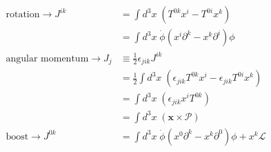 \documentclass[10pt,a4paper]{report}
\theoremstyle{definition}
\begin{document}
\begin{enumerate}[a)]
\begin{align}
\text{rotation}\rightarrow J^{ik}
&=\int d^3x\;(T^{0k}x^i-T^{0i}x^k)\\
&=\int d^3x\;\dot{\phi}(x^i\partial^k-x^k\partial^i)\phi\\
\text{angular momentum}\rightarrow J_j
&\equiv\frac{1}{2}\epsilon_{jik}J^{ik}\\
&=\frac{1}{2}\int d^3x\;(\epsilon_{jik}T^{0k}x^i-\epsilon_{jik}T^{0i}x^k)\\
&=\int d^3x\;(\epsilon_{jik}x^iT^{0k})\\
&=\int d^3x\;(\mathbf{x}\times \mathbf{\mathcal{P}})\\
\text{boost}\rightarrow J^{0k}
&=\int d^3x\;\dot{\phi}(x^0\partial^k-x^k\partial^0)\phi+x^k\mathcal{L}
\end{align}

\end{enumerate}
\end{document}
